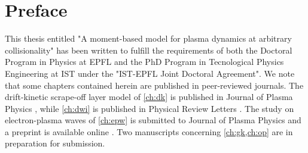 \chapter*{Preface}

This thesis entitled "A moment-based model for plasma dynamics at arbitrary collisionality" has been written to fulfill the requirements of both the Doctoral Program in Physics at EPFL and the PhD Program in Tecnological Physics Engineering at IST under the "IST-EPFL Joint Doctoral Agreement".
%
We note that some chapters contained herein are published in peer-reviewed journals.
%
The drift-kinetic scrape-off layer model of \cref{ch:dk} is published in Journal of Plasma Physics \citep{Jorge2017}, while \cref{ch:dwi} is published in Physical Review Letters \citep{Jorge2018}.
%
The study on electron-plasma waves of \cref{ch:epw} is submitted to Journal of Plasma Physics and a preprint is available online \citep{Jorge2018a}.
%
Two manuscripts concerning \cref{ch:gk,ch:op} are in preparation for submission.